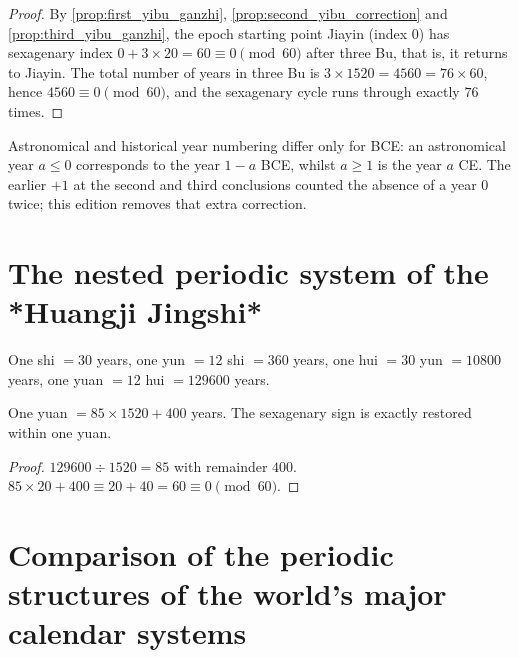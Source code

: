 \begin{proof}
By \cref{prop:first_yibu_ganzhi}, \cref{prop:second_yibu_correction} and \cref{prop:third_yibu_ganzhi}, the epoch starting point Jiayin (index \(0\)) has sexagenary index \(0+3\times 20=60\equiv 0\pmod{60}\) after three Bu, that is, it returns to Jiayin. The total number of years in three Bu is \(3\times 1520=4560=76\times 60\), hence \(4560\equiv 0\pmod{60}\), and the sexagenary cycle runs through exactly \(76\) times.
\end{proof}

\begin{remark}\label{rem:calendar_year_difference}
Astronomical and historical year numbering differ only for BCE: an astronomical year \(a\le 0\) corresponds to the year \(1-a\) BCE, whilst \(a\ge 1\) is the year \(a\) CE. The earlier \(+1\) at the second and third conclusions counted the absence of a year \(0\) twice; this edition removes that extra correction.
\end{remark}

\section{The nested periodic system of the *Huangji Jingshi*}
\label{sec:huangji_jingshi}

\begin{definition}\label{def:yuan_hui_yun_shi}
One shi \(=30\) years, one yun \(=12\) shi \(=360\) years, one hui \(=30\) yun \(=10800\) years, one yuan \(=12\) hui \(=129600\) years.
\end{definition}

\begin{theorem}\label{thm:xuanyuan_yuanhuiyunshi}
One yuan \(=85\times 1520+400\) years. The sexagenary sign is exactly restored within one yuan.
\end{theorem}

\begin{proof}
\(129600\div 1520=85\) with remainder \(400\). \(85\times 20+400\equiv 20+40=60\equiv 0\pmod{60}\).
\end{proof}

\section{Comparison of the periodic structures of the world's major calendar systems}
\label{sec:world_calendars}

